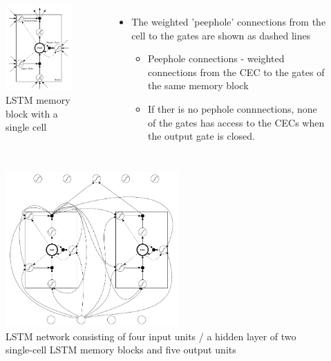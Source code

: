 \documentclass{beamer}
\begin{document}
{
	\begin{columns}
		\begin{figure}[ht]  
			\begin{center}
				\includegraphics[width=1.8in]{Images/LSTM_detail.png}   
			\end{center}   
			\caption{\centering LSTM memory block with a single cell}
		\end{figure}
		\begin{itemize}
			\item The weighted 'peephole' connections from the cell to the gates are shown as dashed lines
			\begin{itemize}
				\item Peephole connections - weighted connections from the CEC to the gates of the same memory block
				\item If ther is no pephole connnections, none of the gates has access to the CECs when the output gate is closed. 
			\end{itemize}	
		\end{itemize}
	\end{columns}
}
\frame
{
		\begin{figure}[ht]  
			\begin{center}
				\includegraphics[width=2.6in]{Images/LSTM_network.png}   
			\end{center}   
			\caption{\centering LSTM network consisting of four input units / a hidden layer of two single-cell LSTM memory blocks and five output units}
		\end{figure}
}
\end{document}
